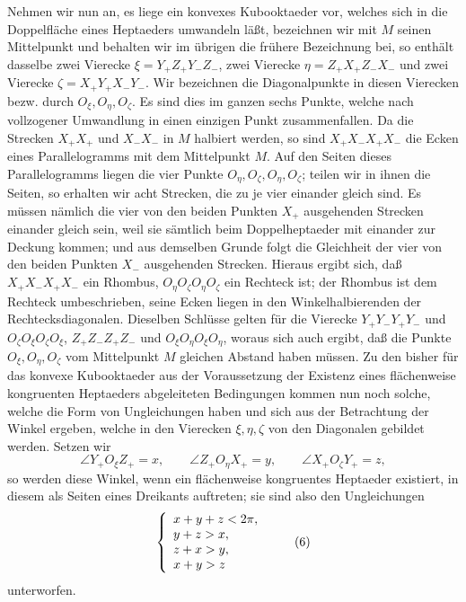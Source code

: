 \documentclass[11pt,a4paper]{article}
\begin{document}
Nehmen wir nun an, es liege ein konvexes Kubooktaeder vor, welches sich in die Doppelfl\"ache eines Heptaeders umwandeln l\"a\ss{}t, bezeichnen wir mit $M$ seinen Mittelpunkt und behalten wir im \"ubrigen die fr\"uhere Bezeichnung bei, so enth\"alt dasselbe zwei Vierecke $\xi=Y_+Z_+Y_-Z_-$, zwei Vierecke $\eta=Z_+X_+Z_-X_-$ und zwei Vierecke $\zeta=X_+Y_+X_-Y_-$. Wir bezeichnen die Diagonalpunkte in diesen Vierecken bezw. durch $O_\xi,O_\eta,O_\zeta$. Es sind dies im ganzen sechs Punkte, welche nach vollzogener Umwandlung in einen einzigen Punkt zusammenfallen. Da die Strecken $X_+X_+$ und $X_-X_-$ in $M$ halbiert werden, so sind $X_+X_-X_+X_-$ die Ecken eines Parallelogramms mit dem Mittelpunkt $M$. Auf den Seiten dieses Parallelogramms liegen die vier Punkte $O_\eta,O_\zeta,O_\eta,O_\zeta$; teilen wir in ihnen die Seiten, so erhalten wir acht Strecken, die zu je vier einander gleich sind. Es m\"ussen n\"amlich die vier von den beiden Punkten $X_+$ ausgehenden Strecken einander gleich sein, weil sie s\"amtlich beim Doppelheptaeder mit einander zur Deckung kommen; und aus demselben Grunde folgt die Gleichheit der vier von den beiden Punkten $X_-$ ausgehenden Strecken. Hieraus ergibt sich, da\ss{} $X_+X_-X_+X_-$ ein Rhombus, $O_\eta O_\zeta O_\eta O_\zeta$ ein Rechteck ist; der Rhombus ist dem Rechteck umbeschrieben, seine Ecken liegen in den Winkelhalbierenden der Rechtecksdiagonalen. Dieselben Schl\"usse gelten f\"ur die Vierecke $Y_+Y_-Y_+Y_-$ und $O_\zeta O_\xi O_\zeta O_\xi$, $Z_+Z_-Z_+Z_-$ und $O_\xi O_\eta O_\xi O_\eta$, woraus sich auch ergibt, da\ss{} die Punkte $O_\xi,O_\eta,O_\zeta$ vom Mittelpunkt $M$ gleichen Abstand haben m\"ussen. Zu den bisher f\"ur das konvexe Kubooktaeder aus der Voraussetzung der Existenz eines fl\"achenweise kongruenten Heptaeders abgeleiteten Bedingungen kommen nun noch solche, welche die Form von Ungleichungen haben und sich aus der Betrachtung der Winkel ergeben, welche in den Vierecken $\xi,\eta,\zeta$ von den Diagonalen gebildet werden. Setzen wir
\[
\angle Y_+O_\xi Z_+=x,\qquad
\angle Z_+O_\eta X_+=y,\qquad
\angle X_+O_\zeta Y_+=z,
\tag{5}
\]
so werden diese Winkel, wenn ein fl\"achenweise kongruentes Heptaeder existiert, in diesem als Seiten eines Dreikants auftreten; sie sind also den Ungleichungen
\[
\left\{
\begin{array}{l}
 x+y+z<2\pi,\vphantom{\Large A}\\
 y+z>x,\\
 z+x>y,\\
 x+y>z
\end{array}
\right.\tag{6}
\]
unterworfen.
\end{document}
